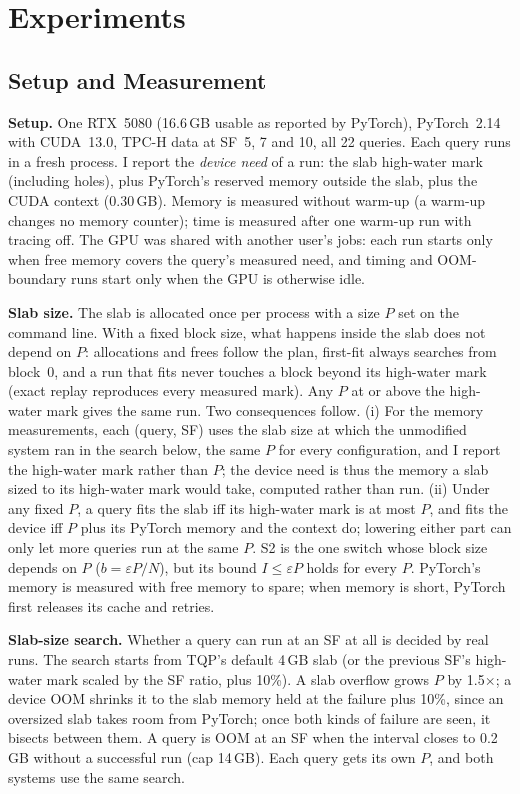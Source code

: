 \documentclass[10pt,twocolumn,letterpaper]{article}
\begin{document}
\section{Experiments}
\label{sec:exp}
\subsection{Setup and Measurement}
\textbf{Setup.} One RTX~5080 (16.6\,GB usable as reported by PyTorch), PyTorch~2.14 with
CUDA~13.0, TPC-H data at SF~5, 7 and 10, all 22 queries. Each query runs in a fresh
process. I report the \emph{device need} of a run: the slab high-water mark (including
holes), plus PyTorch's reserved memory outside the slab, plus the CUDA context (0.30\,GB).
Memory is measured without warm-up (a warm-up changes no memory counter); time is measured
after one warm-up run with tracing off. The GPU was shared with another user's jobs:
each run starts only when free memory covers the query's measured need, and timing and
OOM-boundary runs start only when the GPU is otherwise idle.

\textbf{Slab size.} The slab is allocated once per process with a size $P$ set on the
command line. With a fixed block size, what happens inside the slab does not depend on
$P$: allocations and frees follow the plan, first-fit always searches from block~0, and a
run that fits never touches a block beyond its high-water mark (exact replay reproduces
every measured mark). Any $P$ at or above the high-water mark gives the same run. Two
consequences follow. (i) For the memory measurements, each (query, SF) uses the slab size at
which the unmodified system ran in the search below, the same $P$ for every configuration,
and I report the high-water mark rather than $P$; the device need is thus the memory a slab
sized to its high-water mark would take, computed rather than run. (ii) Under any fixed $P$,
a query fits the slab iff its high-water mark is at most $P$, and fits the device iff $P$
plus its PyTorch memory and the context do; lowering either part can only let more queries
run at the same $P$. S2 is the one switch whose block size depends on $P$ ($b=\varepsilon P/N$),
but its bound $I\le\varepsilon P$ holds for every $P$. PyTorch's memory is measured with free
memory to spare; when memory is short, PyTorch first releases its cache and retries.

\textbf{Slab-size search.} Whether a query can run at an SF at all is decided by real runs.
The search starts from TQP's default 4\,GB slab (or the previous SF's high-water mark scaled
by the SF ratio, plus 10\%). A slab overflow grows $P$ by 1.5$\times$; a device OOM shrinks it
to the slab memory held at the failure plus 10\%, since an oversized slab takes room from
PyTorch; once both kinds of failure are seen, it bisects between them. A query is OOM at an
SF when the interval closes to 0.2\,GB without a successful run (cap 14\,GB). Each query
gets its own $P$, and both systems use the same search.
\end{document}
